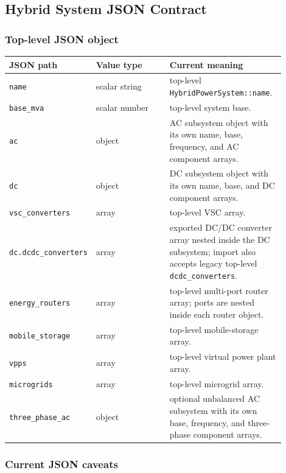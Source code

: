 \subsection{Hybrid System JSON Contract}

\subsubsection*{Top-level JSON object}

\begin{longtable}{L{0.20\linewidth}L{0.28\linewidth}L{0.42\linewidth}}
\toprule
JSON path & Value type & Current meaning \\
\midrule
\endhead
\texttt{name} & scalar string & top-level \texttt{HybridPowerSystem::name}. \\
\texttt{base\_mva} & scalar number & top-level system base. \\
\texttt{ac} & object & AC subsystem object with its own name, base, frequency, and AC component arrays. \\
\texttt{dc} & object & DC subsystem object with its own name, base, and DC component arrays. \\
\texttt{vsc\_converters} & array & top-level VSC array. \\
\texttt{dc.dcdc\_converters} & array & exported DC/DC converter array nested inside the DC subsystem; import also accepts legacy top-level \texttt{dcdc\_converters}. \\
\texttt{energy\_routers} & array & top-level multi-port router array; ports are nested inside each router object. \\
\texttt{mobile\_storage} & array & top-level mobile-storage array. \\
\texttt{vpps} & array & top-level virtual power plant array. \\
\texttt{microgrids} & array & top-level microgrid array. \\
\texttt{three\_phase\_ac} & object & optional unbalanced AC subsystem with its own base, frequency, and three-phase component arrays. \\
\bottomrule
\end{longtable}

\subsubsection*{Current JSON caveats}

